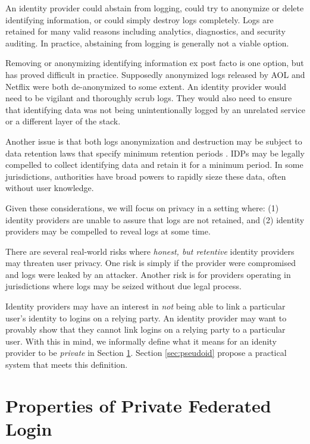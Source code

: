 \documentclass{llncs}
\begin{document}
An identity provider could abstain from logging, could try to
anonymize or delete identifying information, or could simply destroy
logs completely. Logs are retained for many valid reasons including
analytics, diagnostics, and security auditing. In practice, abstaining
from logging is generally not a viable option.

Removing or anonymizing identifying information ex post facto is one
option, but has proved difficult in practice. Supposedly anonymized
logs released by AOL \cite{BarZel06} and Netflix \cite{NaSh08} were
both de-anonymized to some extent. An identity provider would need to
be vigilant and thoroughly scrub logs. They would also need to ensure
that identifying data was not being unintentionally logged by an
unrelated service or a different layer of the stack.

Another issue is that both logs anonymization and destruction may be
subject to data retention laws that specify minimum retention periods
\cite{EUDir}. IDPs may be legally compelled to collect identifying
data and retain it for a minimum period. In some jurisdictions,
authorities have broad powers to rapidly sieze these data, often
without user knowledge.

Given these considerations, we will focus on privacy in a setting where:
(1) identity providers are unable to assure that logs are not retained, and
(2) identity providers may be compelled to reveal logs at some time.

There are several real-world risks where \emph{honest, but retentive}
identity providers may threaten user privacy. One risk is simply if
the provider were compromised and logs were leaked by an
attacker. Another risk is for providers operating in jurisdictions
where logs may be seized without due legal process. 

Identity providers may have an interest in \emph{not} being able to
link a particular user's identity to logins on a relying party. An
identity provider may want to provably show that they cannot link
logins on a relying party to a particular user. With this in mind, we
informally define what it means for an idenity provider to be
\emph{private} in Section \ref{sec:private-fed-login}. Section
\ref{sec:pseudoid} propose a practical system that meets this
definition.

\section{Properties of Private Federated Login}
\label{sec:private-fed-login}
\end{document}
